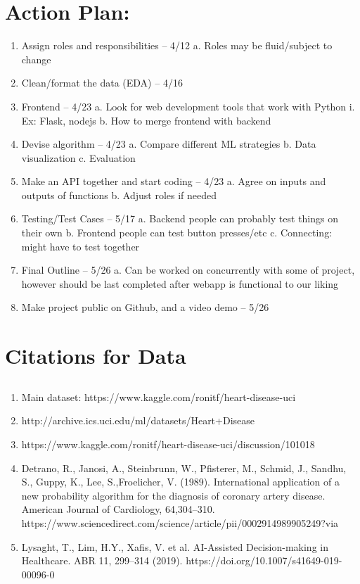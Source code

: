 \documentclass[12pt]{article}
\begin{document}
\section*{Action Plan: }
\begin{enumerate}
    \item Assign roles and responsibilities -- 4/12
    \subitem a. Roles may be fluid/subject to change
    \item Clean/format the data (EDA) -- 4/16
    \item Frontend -- 4/23
    \subitem a. Look for web development tools that work with Python 
    \subsubitem i. Ex: Flask, nodejs
    \subitem b. How to merge frontend with backend
    \item Devise algorithm -- 4/23
    \subitem a. Compare different ML strategies
    \subitem b. Data visualization
    \subitem c. Evaluation
    \item Make an API together and start coding -- 4/23
    \subitem a. Agree on inputs and outputs of functions
    \subitem b. Adjust roles if needed
    \item Testing/Test Cases -- 5/17
    \subitem a. Backend people can probably test things on their own
    \subitem b. Frontend people can test button presses/etc
    \subitem c. Connecting: might have to test together
    \item Final Outline -- 5/26
    \subitem a. Can be worked on concurrently with some of project, however should be last completed after webapp is functional to our liking
    \item Make project public on Github, and a video demo -- 5/26   
\end{enumerate}

\section*{Citations for Data}
\subsection*{}
\begin{enumerate}
    \item Main dataset: https://www.kaggle.com/ronitf/heart-disease-uci
    \item http://archive.ics.uci.edu/ml/datasets/Heart+Disease
    \item https://www.kaggle.com/ronitf/heart-disease-uci/discussion/101018
    \item Detrano, R., Janosi, A., Steinbrunn, W., Pfisterer, M., Schmid, J., 
    Sandhu, S., Guppy, K., Lee, S.,Froelicher, V. (1989). International 
    application of a new probability algorithm for the diagnosis of coronary 
    artery disease. American Journal of Cardiology, 64,304--310. 
    https://www.sciencedirect.com/science/article/pii/0002914989905249?via%
    \item Lysaght, T., Lim, H.Y., Xafis, V. et al. AI-Assisted Decision-making in Healthcare. ABR 11, 299–314 (2019). https://doi.org/10.1007/s41649-019-00096-0
\end{enumerate}
\end{document}
